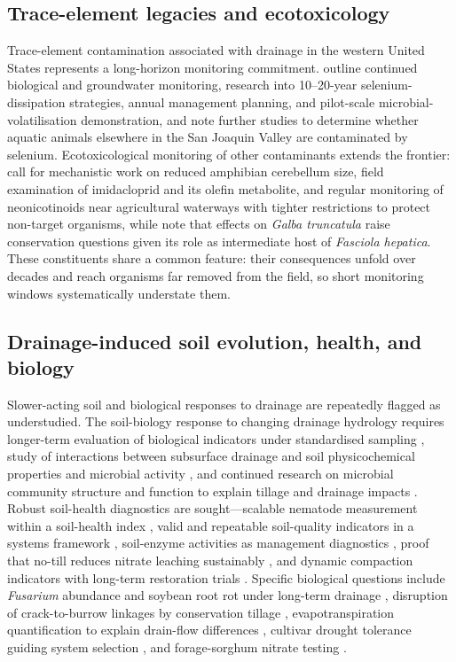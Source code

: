 \documentclass[11pt]{article}
\begin{document}
\subsection{Trace-element legacies and ecotoxicology}

Trace-element contamination associated with drainage in the western United States
represents a long-horizon monitoring commitment. \textcite{BENSON1993} outline
continued biological and groundwater monitoring, research into 10--20-year
selenium-dissipation strategies, annual management planning, and pilot-scale
microbial-volatilisation demonstration, and \textcite{SAIKI1987} note further
studies to determine whether aquatic animals elsewhere in the San Joaquin Valley
are contaminated by selenium. Ecotoxicological monitoring of other contaminants
extends the frontier: \textcite{Campbell2023} call for mechanistic work on
reduced amphibian cerebellum size, field examination of imidacloprid and its
olefin metabolite, and regular monitoring of neonicotinoids near agricultural
waterways with tighter restrictions to protect non-target organisms, while
\textcite{Dreyfuss2018} note that effects on \textit{Galba truncatula} raise
conservation questions given its role as intermediate host of \textit{Fasciola
hepatica}. These constituents share a common feature: their consequences unfold
over decades and reach organisms far removed from the field, so short monitoring
windows systematically understate them.

\subsection{Drainage-induced soil evolution, health, and biology}

Slower-acting soil and biological responses to drainage are repeatedly flagged as
understudied. The soil-biology response to changing drainage hydrology requires
longer-term evaluation of biological indicators under standardised sampling
\parencite{Sherbine2023}, study of interactions between subsurface drainage and
soil physicochemical properties and microbial activity \parencite{Yang2025}, and
continued research on microbial community structure and function to explain
tillage and drainage impacts \parencite{Kaur2024b,Kumar2014}. Robust soil-health
diagnostics are sought---scalable nematode measurement within a soil-health index
\parencite{Li2023b}, valid and repeatable soil-quality indicators in a systems
framework \parencite{Nakajima2015}, soil-enzyme activities as management
diagnostics \parencite{Singh2007}, proof that no-till reduces nitrate leaching
sustainably \parencite{Masri2024}, and dynamic compaction indicators with
long-term restoration trials \parencite{Caron2025}. Specific biological questions
include \textit{Fusarium} abundance and soybean root rot under long-term drainage
\parencite{Han2017}, disruption of crack-to-burrow linkages by conservation
tillage \parencite{Shipitalo2004}, evapotranspiration quantification to explain
drain-flow differences \parencite{Daigh2014}, cultivar drought tolerance guiding
system selection \parencite{DarziNaftchali2017b}, and forage-sorghum nitrate
testing \parencite{Nash2017}.
\end{document}
